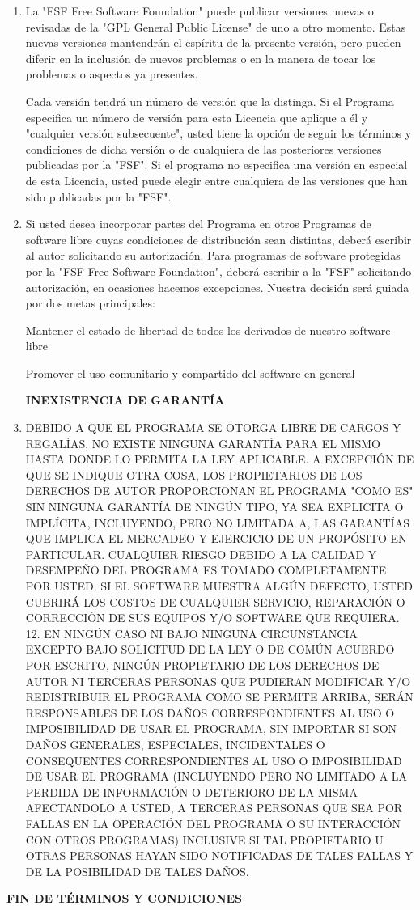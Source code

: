 \begin{enumerate}
\item La "FSF Free Software Foundation" puede publicar versiones nuevas o revisadas de la "GPL General Public License" de uno a otro momento. Estas nuevas versiones mantendrán el espíritu de la presente versión, pero pueden diferir en la inclusión de nuevos problemas o en la manera de tocar los problemas o aspectos ya presentes. 

Cada versión tendrá un número de versión que la distinga. Si el Programa especifica un número de versión para esta Licencia que aplique a él y "cualquier versión subsecuente", usted tiene la opción de seguir los términos y condiciones de dicha versión o de cualquiera de las posteriores versiones publicadas por la "FSF". Si el programa no especifica una versión en especial de esta Licencia, usted puede elegir entre cualquiera de las versiones que han sido publicadas por la "FSF". 

\item  Si usted desea incorporar partes del Programa en otros Programas de software libre cuyas condiciones de distribución sean distintas, deberá escribir al autor solicitando su autorización. Para programas de software protegidas por la "FSF Free Software Foundation", deberá escribir a la "FSF" solicitando autorización, en ocasiones hacemos excepciones. Nuestra decisión será guiada por dos metas principales: 

Mantener el estado de libertad de todos los derivados de nuestro software libre 

Promover el uso comunitario y compartido del software en general 


\textbf{INEXISTENCIA DE GARANTÍA}

\item  DEBIDO A QUE EL PROGRAMA SE OTORGA LIBRE DE CARGOS Y REGALÍAS, NO EXISTE NINGUNA GARANTÍA PARA EL MISMO HASTA DONDE LO PERMITA LA LEY APLICABLE. A EXCEPCIÓN DE QUE SE INDIQUE OTRA COSA, LOS PROPIETARIOS DE LOS DERECHOS DE AUTOR PROPORCIONAN EL PROGRAMA "COMO ES" SIN NINGUNA GARANTÍA DE NINGÚN TIPO, YA SEA EXPLICITA O IMPLÍCITA, INCLUYENDO, PERO NO LIMITADA A, LAS GARANTÍAS QUE IMPLICA EL MERCADEO Y EJERCICIO DE UN PROPÓSITO EN PARTICULAR. CUALQUIER RIESGO DEBIDO A LA CALIDAD Y DESEMPEÑO DEL PROGRAMA ES TOMADO COMPLETAMENTE POR USTED. SI EL SOFTWARE MUESTRA ALGÚN DEFECTO, USTED CUBRIRÁ LOS COSTOS DE CUALQUIER SERVICIO, REPARACIÓN O CORRECCIÓN DE SUS EQUIPOS Y/O SOFTWARE QUE REQUIERA. 
12. EN NINGÚN CASO NI BAJO NINGUNA CIRCUNSTANCIA EXCEPTO BAJO SOLICITUD DE LA LEY O DE COMÚN ACUERDO POR ESCRITO, NINGÚN PROPIETARIO DE LOS DERECHOS DE AUTOR NI TERCERAS PERSONAS QUE PUDIERAN MODIFICAR Y/O REDISTRIBUIR EL PROGRAMA COMO SE PERMITE ARRIBA, SERÁN RESPONSABLES DE LOS DAÑOS CORRESPONDIENTES AL USO O IMPOSIBILIDAD DE USAR EL PROGRAMA, SIN IMPORTAR SI SON DAÑOS GENERALES, ESPECIALES, INCIDENTALES O CONSEQUENTES CORRESPONDIENTES AL USO O IMPOSIBILIDAD DE USAR EL PROGRAMA (INCLUYENDO PERO NO LIMITADO A LA PERDIDA DE INFORMACIÓN O DETERIORO DE LA MISMA AFECTANDOLO A USTED, A TERCERAS PERSONAS QUE SEA POR FALLAS EN LA OPERACIÓN DEL PROGRAMA O SU INTERACCIÓN CON OTROS PROGRAMAS) INCLUSIVE SI TAL PROPIETARIO U OTRAS PERSONAS HAYAN SIDO NOTIFICADAS DE TALES FALLAS Y DE LA POSIBILIDAD DE TALES DAÑOS. 

\end{enumerate}

\textbf{FIN DE TÉRMINOS Y CONDICIONES} 

